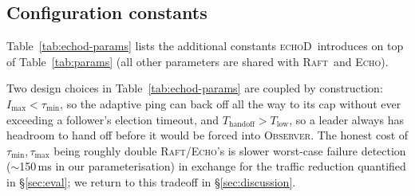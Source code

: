 \documentclass[conference]{IEEEtran}
\newcommand{\echoproto}{\textsc{Echo}\xspace}
\newcommand{\raftproto}{\textsc{Raft}\xspace}
\newcommand{\echodproto}{\textsc{echoD}\xspace}
\begin{document}
\subsection{Configuration constants}
Table~\ref{tab:echod-params} lists the additional constants
\echodproto\ introduces on top of Table~\ref{tab:params} (all other
parameters are shared with \raftproto\ and \echoproto).

\begin{table}[t]
\centering
\caption{Additional \echodproto\ parameters.}
\label{tab:echod-params}
\setlength{\tabcolsep}{3pt}
\end{table}

Two design choices in Table~\ref{tab:echod-params} are coupled by
construction: $I_{\max} < \tau_{\min}$, so the adaptive ping can back off
all the way to its cap without ever exceeding a follower's election
timeout, and $T_{\text{handoff}} > T_{\text{low}}$, so a leader always
has headroom to hand off before it would be forced into
\textsc{Observer}. The honest cost of
$\tau_{\min},\tau_{\max}$ being roughly double \raftproto/\echoproto's
is slower worst-case failure detection ($\sim$150\,ms in our
parameterisation) in exchange for the traffic reduction quantified in
\S\ref{sec:eval}; we return to this tradeoff in
\S\ref{sec:discussion}.
\end{document}
